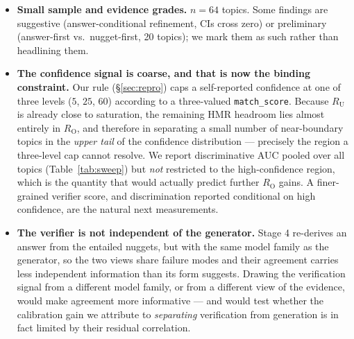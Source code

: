 \documentclass[sigconf,nonacm]{acmart}
\newcommand{\HMR}{\textsc{HMR}}
\newcommand{\RO}{R_{\mathrm{O}}}
\newcommand{\RU}{R_{\mathrm{U}}}
\begin{document}
\begin{itemize}
    free. The complementary claim --- that our (Sonnet-prompted) pipeline run \emph{on
    Haiku} would remain \emph{competitive with the field-leading team} (in the field's competitive range, not a decisive lead) --- is unaffected, since it evaluates the actual
    deployed pipeline on a cheaper model.
  \item \textbf{Small sample and evidence grades.} $n=64$ topics. Some findings are
    suggestive (answer-conditional refinement, CIs cross zero) or preliminary
    (answer-first vs.\ nugget-first, 20 topics); we mark them as such rather than
    headlining them.
  \item \textbf{The confidence signal is coarse, and that is now the binding
    constraint.} Our rule (\S\ref{sec:repro}) caps a self-reported confidence at one of
    three levels ($5$, $25$, $60$) according to a three-valued
    \texttt{match\_score}. Because $\RU$ is already close to saturation, the remaining
    \HMR{} headroom lies almost entirely in $\RO$, and therefore in separating a small
    number of near-boundary topics in the \emph{upper tail} of the confidence
    distribution --- precisely the region a three-level cap cannot resolve. We report
    discriminative AUC pooled over all topics (Table~\ref{tab:sweep}) but
    \emph{not} restricted to the high-confidence region, which is the quantity that
    would actually predict further $\RO$ gains. A finer-grained verifier score, and
    discrimination reported conditional on high confidence, are the natural next
    measurements.
  \item \textbf{The verifier is not independent of the generator.} Stage 4 re-derives an
    answer from the entailed nuggets, but with the same model family as the generator, so
    the two views share failure modes and their agreement carries less independent
    information than its form suggests. Drawing the verification signal from a different
    model family, or from a different view of the evidence, would make agreement more
    informative --- and would test whether the calibration gain we attribute to
    \emph{separating} verification from generation is in fact limited by their residual
    correlation.
\end{itemize}
\end{document}
